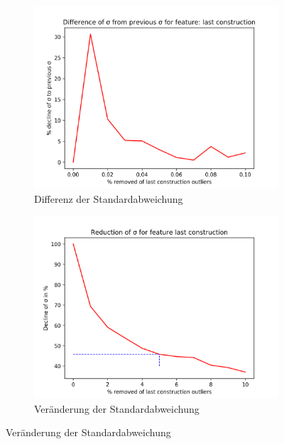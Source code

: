 \begin{figure}[H]
\begin{subfigure}{.5\textwidth}
  \includegraphics[width=\linewidth]{images/anhang/outlier_detection/last_construction_diff_of_std.png}
  \caption{Differenz der Standardabweichung}
\end{subfigure}
\begin{subfigure}{.5\textwidth}
  \centering
  \includegraphics[width=\linewidth]{images/anhang/outlier_detection/last_construction_std.png}
  \caption{Veränderung der Standardabweichung}
\end{subfigure}
\end{figure}

